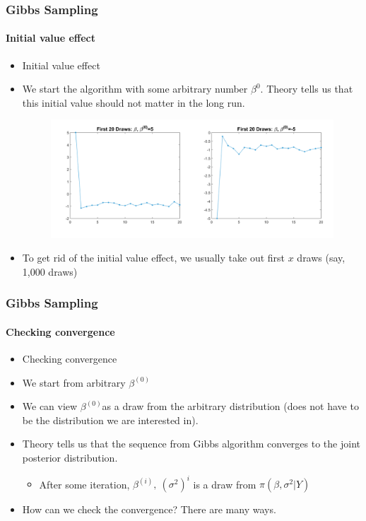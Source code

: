 \documentclass[
  shownotes,
  xcolor={svgnames},
  hyperref={colorlinks,citecolor=DarkBlue,linkcolor=DarkRed,urlcolor=DarkBlue}
  , aspectratio=169]{beamer}
\begin{document}
\begin{frame}[fragile]
\frametitle{Gibbs Sampling} 
\framesubtitle{Initial value effect}

\begin{itemize}
\item Initial value effect

\item We start the algorithm with some arbitrary number $\beta^{0}$. Theory tells us that this initial value should not matter in the long run.


   
\begin{figure}[H] \centering
  \centering
  \includegraphics[scale=0.45]{figures/fig3_gibbs}
  \\
  \tiny 
\end{figure}

\item To get rid of the initial value effect, we usually take out first $x$ draws (say, 1,000 draws)
\end{itemize}
 \end{frame}
\begin{frame}[fragile]
\frametitle{Gibbs Sampling} 
\framesubtitle{Checking convergence}

\begin{itemize}
\item Checking convergence
\medskip
\item We start from arbitrary $\beta^{\left( 0 \right)}$
\medskip
\item We can view $\beta^{\left( 0 \right)}$as a draw from the arbitrary distribution (does not have to be the distribution we are interested in).

\item Theory tells us that the sequence from Gibbs algorithm converges to the joint posterior distribution.
\medskip
    \begin{itemize}
        \item After some iteration, $\beta^{\left( i \right)},\ \left( \sigma^{2} \right)^{i}$ is a draw from $\pi\left( \beta,\sigma^{2}|Y \right)^{}$
    \end{itemize}

\item How can we check the convergence? There are many ways.

\end{itemize}

  \end{frame}
\end{document}

